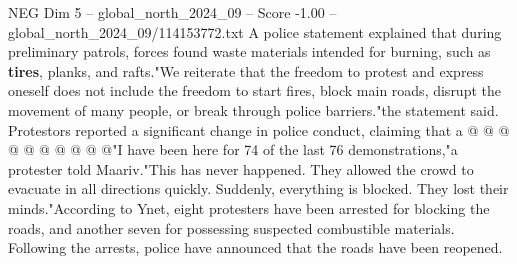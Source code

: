 \begin{textsample}{NEG Dim 5 – global\_north\_2024\_09 – Score -1.00 – global\_north\_2024\_09/114153772.txt}
A police statement explained that during preliminary patrols, forces found waste materials intended for burning, such as \textbf{tires}, planks, and rafts."We reiterate that the freedom to protest and express oneself does not include the freedom to start fires, block main roads, disrupt the movement of many people, or break through police barriers."the statement said.
Protestors reported a significant change in police conduct, claiming that a @ @ @ @ @ @ @ @ @ @"I have been here for 74 of the last 76 demonstrations,"a protester told Maariv."This has never happened.
They allowed the crowd to evacuate in all directions quickly.
Suddenly, everything is blocked.
They lost their minds."According to Ynet, eight protesters have been arrested for blocking the roads, and another seven for possessing suspected combustible materials.
Following the arrests, police have announced that the roads have been reopened.

\end{textsample}
